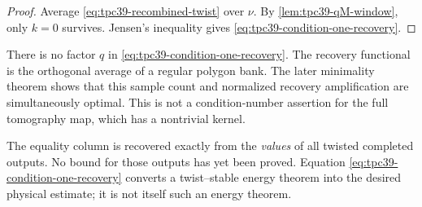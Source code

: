 \begin{proof}
Average \eqref{eq:tpc39-recombined-twist} over \(\nu\).  By
\cref{lem:tpc39-qM-window}, only \(k=0\) survives.  Jensen's inequality
gives \eqref{eq:tpc39-condition-one-recovery}.
\end{proof}

There is no factor \(q\) in
\eqref{eq:tpc39-condition-one-recovery}.  The recovery functional is the
orthogonal average of a regular polygon bank.  The later minimality theorem
shows that this sample count and normalized recovery amplification are
simultaneously optimal.  This is not a condition-number assertion for the
full tomography map, which has a nontrivial kernel.

\begin{remark}
\label{rem:tpc39-algebra-versus-analysis}
The equality column is recovered exactly from the \emph{values} of all
twisted completed outputs.  No bound for those outputs has yet been
proved.  Equation \eqref{eq:tpc39-condition-one-recovery} converts a
twist--stable energy theorem into the desired physical estimate; it is
not itself such an energy theorem.
\end{remark}
